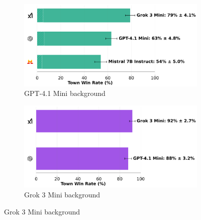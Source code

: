 \documentclass{article}
\begin{document}
\begin{figure}[htbp]
    \centering
    \begin{subfigure}[b]{0.48\textwidth}
        \centering
        \includegraphics[width=\textwidth]{../results/detective_gpt-4.1_mini_v4_1_benchmark.png}
        \caption{GPT-4.1 Mini background}
        \label{fig:detective_gpt41mini}
    \end{subfigure}
    \hfill
    \begin{subfigure}[b]{0.48\textwidth}
        \centering
        \includegraphics[width=\textwidth]{../results/detective_grok_3_mini_v4_1_benchmark.png}
        \caption{Grok 3 Mini background}
        \label{fig:detective_grok3}
    \end{subfigure}
    
    \vspace{0.5cm}
    

\end{figure}
\end{document}
